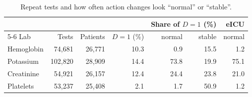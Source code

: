 \begin{table}[t]\centering\footnotesize
\caption{Repeat tests and how often action changes look ``normal'' or ``stable''.}
\label{tab:cohort}\setlength{\tabcolsep}{3pt}
\begin{tabular}{lrrrrrr}\toprule
 & & & & \multicolumn{2}{c}{Share of $D{=}1$ (\%)} & eICU \\ \cmidrule(lr){5-6}
Lab & Tests & Patients & $D{=}1$ (\%) & normal & stable & normal \\ \midrule
Hemoglobin & 74,681 & 26,771 & 10.3 & 0.9 & 15.5 & 1.2 \\
Potassium & 102,820 & 28,909 & 14.4 & 73.8 & 19.9 & 75.1 \\
Creatinine & 54,921 & 26,157 & 12.4 & 24.4 & 23.8 & 21.0 \\
Platelets & 53,237 & 25,408 & 2.1 & 1.7 & 50.9 & 1.2 \\
\bottomrule\end{tabular}\end{table}
